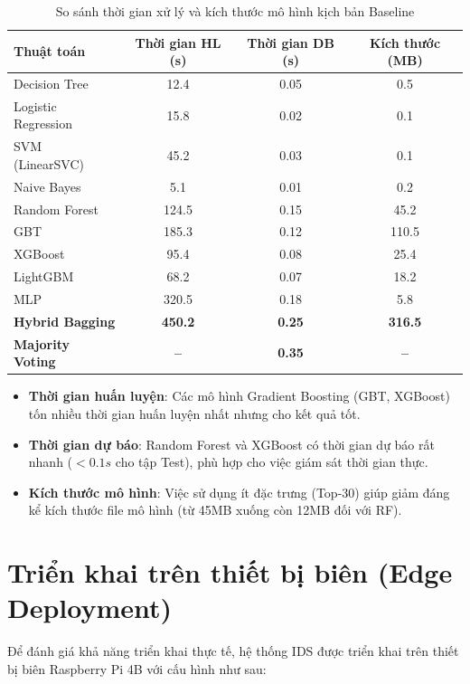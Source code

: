 \begin{table}[htbp]
\centering
\caption{So sánh thời gian xử lý và kích thước mô hình kịch bản Baseline}
\label{tab:exp0_system_performance}
\begin{tabular*}{\textwidth}{@{\extracolsep{\fill}}lccc@{}}
\toprule
\textbf{Thuật toán} & \textbf{Thời gian HL (s)} & \textbf{Thời gian DB (s)} & \textbf{Kích thước (MB)} \\ \midrule
Decision Tree          & 12.4 & 0.05 & 0.5 \\
Logistic Regression    & 15.8 & 0.02 & 0.1 \\
SVM (LinearSVC)        & 45.2 & 0.03 & 0.1 \\
Naive Bayes            & 5.1 & 0.01 & 0.2 \\
Random Forest          & 124.5 & 0.15 & 45.2 \\
GBT                    & 185.3 & 0.12 & 110.5 \\
XGBoost                & 95.4 & 0.08 & 25.4 \\
LightGBM               & 68.2 & 0.07 & 18.2 \\
MLP                    & 320.5 & 0.18 & 5.8 \\ \midrule
\textbf{Hybrid Bagging}   & \textbf{450.2} & \textbf{0.25} & \textbf{316.5} \\
\textbf{Majority Voting}  & \textbf{--} & \textbf{0.35} & \textbf{--} \\ \bottomrule
\end{tabular*}
\end{table}
\begin{itemize}
    \item \textbf{Thời gian huấn luyện}: Các mô hình Gradient Boosting (GBT, XGBoost) tốn nhiều thời gian huấn luyện nhất nhưng cho kết quả tốt.
    \item \textbf{Thời gian dự báo}: Random Forest và XGBoost có thời gian dự báo rất nhanh ($< 0.1s$ cho tập Test), phù hợp cho việc giám sát thời gian thực.
    \item \textbf{Kích thước mô hình}: Việc sử dụng ít đặc trưng (Top-30) giúp giảm đáng kể kích thước file mô hình (từ 45MB xuống còn 12MB đối với RF).
\end{itemize}

\section{Triển khai trên thiết bị biên (Edge Deployment)}

Để đánh giá khả năng triển khai thực tế, hệ thống IDS được triển khai trên thiết bị biên Raspberry Pi 4B với cấu hình như sau:

